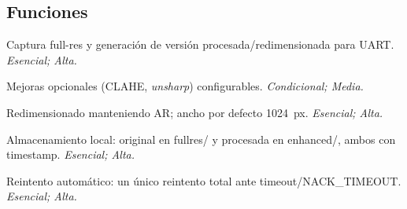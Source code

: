 \documentclass[11pt,codirector]{charter}
\makeatletter
\newcommand{\SI}[2]{#1~#2}
\newcommand{\mytwodigits}[1]{\two@digits{#1}}
\newcounter{reqCounter}
\def\texttt#1{#1}%
\makeatother
\begin{document}
	\subsection{Funciones}
	\begin{description}[leftmargin=1.8cm,style=nextline]
		\item[\textbf{[\CODrequerimiento\mytwodigits{\value{reqCounter}}]}]
		Captura full-res y generación de versión procesada/redimensionada para UART. \emph{Esencial; Alta.}
		
		\item[\textbf{[\CODrequerimiento\mytwodigits{\value{reqCounter}}]}]
		Mejoras opcionales (CLAHE, \textit{unsharp}) configurables. \emph{Condicional; Media.}
		
		\item[\textbf{[\CODrequerimiento\mytwodigits{\value{reqCounter}}]}]
		Redimensionado manteniendo AR; ancho por defecto \SI{1024}{px}. \emph{Esencial; Alta.}
		
		\item[\textbf{[\CODrequerimiento\mytwodigits{\value{reqCounter}}]}]
		Almacenamiento local: original en \texttt{fullres/} y procesada en \texttt{enhanced/}, ambos con timestamp. \emph{Esencial; Alta.}
		
		\item[\textbf{[\CODrequerimiento\mytwodigits{\value{reqCounter}}]}]
		Reintento automático: un único reintento total ante timeout/\texttt{NACK\_TIMEOUT}. \emph{Esencial; Alta.}
	\end{description}
	
\end{document}
